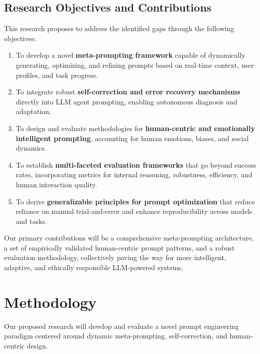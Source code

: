 \documentclass{article}
\begin{document}
\subsection{Research Objectives and Contributions}
This research proposes to address the identified gaps through the following objectives:
\begin{enumerate}
    \item To develop a novel \textbf{meta-prompting framework} capable of dynamically generating, optimizing, and refining prompts based on real-time context, user profiles, and task progress.
    \item To integrate robust \textbf{self-correction and error recovery mechanisms} directly into LLM agent prompting, enabling autonomous diagnosis and adaptation.
    \item To design and evaluate methodologies for \textbf{human-centric and emotionally intelligent prompting}, accounting for human emotions, biases, and social dynamics.
    \item To establish \textbf{multi-faceted evaluation frameworks} that go beyond success rates, incorporating metrics for internal reasoning, robustness, efficiency, and human interaction quality.
    \item To derive \textbf{generalizable principles for prompt optimization} that reduce reliance on manual trial-and-error and enhance reproducibility across models and tasks.
\end{enumerate}
Our primary contributions will be a comprehensive meta-prompting architecture, a set of empirically validated human-centric prompt patterns, and a robust evaluation methodology, collectively paving the way for more intelligent, adaptive, and ethically responsible LLM-powered systems.

\section{Methodology}
Our proposed research will develop and evaluate a novel prompt engineering paradigm centered around dynamic meta-prompting, self-correction, and human-centric design.
\end{document}
